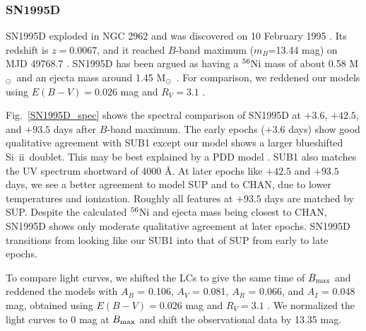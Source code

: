 \documentclass[useAMS,usenatbib,useasmath]{mnras}
\newcommand{\Msun}{\hbox{M$_\odot$}}
\newcommand{\elem}[2][default]{$^{#1}{\rm #2}$}
\newcommand{\skii}{\mbox{Si~{\sc ii}}}
\def\fig{Fig.}
\begin{document}
\subsubsection{SN1995D}%
\label{SN1995D}
SN1995D exploded in NGC 2962 and was discovered on 10 February 1995 \citep{Nakano1995}. Its redshift is $z=0.0067$, and it reached $B$-band maximum ($m_B$=13.44 mag) on MJD 49768.7 \citep{Riess1999CFA1,Jha2007}. SN1995D has been argued as having a \elem[56]{Ni} mass of about 0.58 \Msun\ and an ejecta mass around 1.45 \Msun\ \citep{Childress2015}. For comparison, we reddened our models using $E(B-V)=0.026$ mag and $R_V=3.1$ \citep{Jha2007}.

\fig~\ref{SN1995D_spec} shows the spectral comparison of SN1995D at $+3.6$, $+42.5$, and $+93.5$ days after $B$-band maximum. The early epochs ($+3.6$ days) show good qualitative agreement with SUB1 except our model shows a larger blueshifted \skii\ doublet. This may be best explained by a PDD model \citep{Dessart2014a}. SUB1 also matches the UV spectrum shortward of 4000 \AA. At later epochs like $+42.5$ and $+93.5$ days, we see a better agreement to model SUP and to CHAN, due to lower temperatures and ionization. Roughly all features at $+93.5$ days are matched by SUP. 
Despite the calculated \elem[56]{Ni} and ejecta mass being closest to CHAN, SN1995D shows only moderate qualitative agreement at later epochs. SN1995D transitions from looking like our SUB1 into that of SUP from early to late epochs. 

To compare light curves, we shifted the LCs to give the same time of $B_{\rm max}$ and  reddened the models with $A_B$ = 0.106, $A_V$ = 0.081, $A_R$ = 0.066, and $A_I$ = 0.048 mag, obtained using $E(B-V)=0.026$ mag and $R_V=3.1$ \citep{Jha2007}. We normalized the light curves to 0 mag at $B_{\rm max}$ and shift the observational data by 13.35 mag. 
\end{document}
